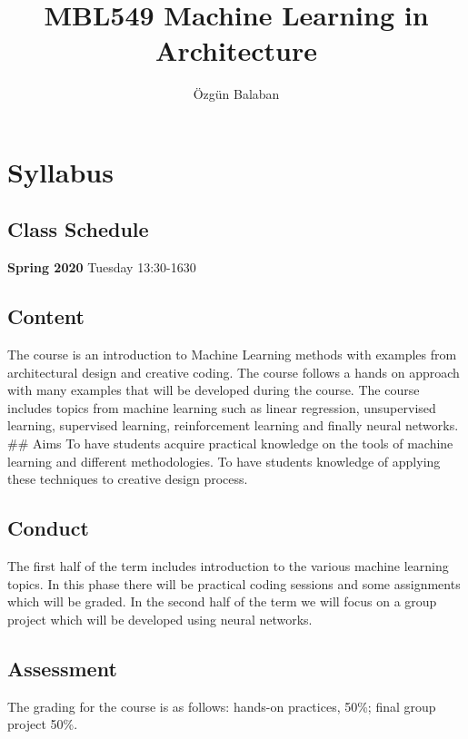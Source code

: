 \documentclass[]{book}
\title{MBL549 Machine Learning in Architecture}
\author{Özgün Balaban}
\date{}
\begin{document}
\maketitle

{
\setcounter{tocdepth}{1}
\tableofcontents
}
\chapter{Syllabus}\label{intro}

\section{Class Schedule}\label{class-schedule}

\textbf{Spring 2020} Tuesday 13:30-1630

\section{Content}\label{content}

The course is an introduction to Machine Learning methods with examples
from architectural design and creative coding. The course follows a
hands on approach with many examples that will be developed during the
course. The course includes topics from machine learning such as linear
regression, unsupervised learning, supervised learning, reinforcement
learning and finally neural networks. \#\# Aims To have students acquire
practical knowledge on the tools of machine learning and different
methodologies. To have students knowledge of applying these techniques
to creative design process.

\section{Conduct}\label{conduct}

The first half of the term includes introduction to the various machine
learning topics. In this phase there will be practical coding sessions
and some assignments which will be graded. In the second half of the
term we will focus on a group project which will be developed using
neural networks.

\section{Assessment}\label{assessment}

The grading for the course is as follows: hands-on practices, 50\%;
final group project 50\%.
\end{document}

